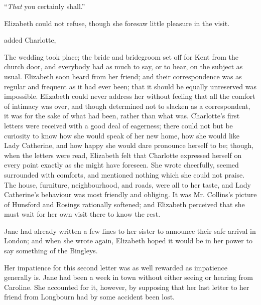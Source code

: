 
“{\em That} you certainly shall.”




Elizabeth could not refuse, though she foresaw little pleasure in the visit.

 added Charlotte, 

The wedding took place; the bride and bridegroom set off for Kent from the church door, and everybody had as much to say, or to hear, on the subject as usual. Elizabeth soon heard from her friend; and their correspondence was as regular and frequent as it had ever been; that it should be equally unreserved was impossible. Elizabeth could never address her without feeling that all the comfort of intimacy was over, and though determined not to slacken as a correspondent, it was for the sake of what had been, rather than what was. Charlotte's first letters were received with a good deal of eagerness; there could not but be curiosity to know how she would speak of her new home, how she would like Lady Catherine, and how happy she would dare pronounce herself to be; though, when the letters were read, Elizabeth felt that Charlotte expressed herself on every point exactly as she might have foreseen. She wrote cheerfully, seemed surrounded with comforts, and mentioned nothing which she could not praise. The house, furniture, neighbourhood, and roads, were all to her taste, and Lady Catherine's behaviour was most friendly and obliging. It was Mr. Collins's picture of Hunsford and Rosings rationally softened; and Elizabeth perceived that she must wait for her own visit there to know the rest.

Jane had already written a few lines to her sister to announce their safe arrival in London; and when she wrote again, Elizabeth hoped it would be in her power to say something of the Bingleys.

Her impatience for this second letter was as well rewarded as impatience generally is. Jane had been a week in town without either seeing or hearing from Caroline. She accounted for it, however, by supposing that her last letter to her friend from Longbourn had by some accident been lost.

